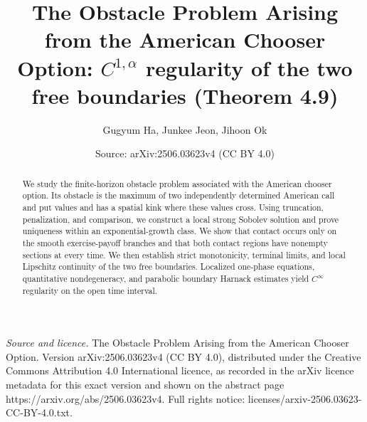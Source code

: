 \documentclass[10pt,a4paper]{amsart}
\title[$C^{1,\alpha}$ regularity of the free boundaries for the American chooser option (Theorem 4.9)]{The Obstacle Problem Arising from the American Chooser Option: $C^{1,\alpha}$ regularity of the two free boundaries (Theorem 4.9)}
\author{Gugyum Ha, Junkee Jeon, Jihoon Ok}
\date{Source: arXiv:2506.03623v4 (CC BY 4.0)}
\begin{document}
\begin{abstract}
We study the finite-horizon obstacle problem associated with the American
chooser option. Its obstacle is the maximum of two independently determined
American call and put values and has a spatial kink where these values
cross. Using truncation, penalization, and comparison, we construct a local
strong Sobolev solution and prove uniqueness within an exponential-growth
class. We show that contact occurs only on the smooth exercise-payoff
branches and that both contact regions have nonempty sections at every
time. We then establish strict monotonicity, terminal limits, and local
Lipschitz continuity of the two free boundaries. Localized one-phase
equations, quantitative nondegeneracy, and parabolic boundary Harnack
estimates yield $C^\infty$ regularity on the open time interval.


\end{abstract}
\maketitle

\noindent\emph{Source and licence.} The Obstacle Problem Arising from the American Chooser Option. Version arXiv:2506.03623v4 (CC BY 4.0), distributed under the Creative Commons Attribution 4.0 International licence, as recorded in the arXiv licence metadata for this exact version and shown on the abstract page https://arxiv.org/abs/2506.03623v4. Full rights notice: licenses/arxiv-2506.03623-CC-BY-4.0.txt.\par\smallskip
\end{document}
